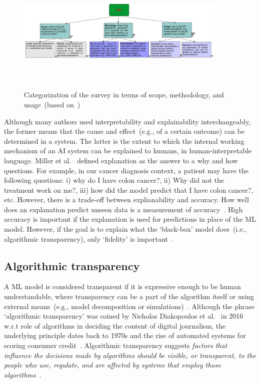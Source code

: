 \begin{figure}[h]
	\centering
	\includegraphics[width=0.9\textwidth,height=60mm]{images/xai_tec.png}	
    \caption{Categorization of the survey in terms of scope, methodology, and usage~(based on~\cite{das2020opportunities})}	
	\label{fig:survey_xai}
\end{figure}

\hspace*{3.5mm} Although many authors used interpretability and explainability interchangeably, the former means that the cause and effect~(e.g., of a certain outcome) can be determined in a system. The latter is the extent to which the internal working mechanism of an AI system can be explained to humans, in human-interpretable language. Miller et al.~\cite{miller2018explanation} defined explanation as the answer to a why and how questions. For example, in our cancer diagnosis context, a patient may have the following questions: i) why do I have colon cancer?, ii) Why did not the treatment work on me?, iii) how did the model predict that I have colon cancer?, etc. However, there is a trade-off between explianability and accuracy. How well does an explanation predict unseen data is a measurement of accuracy~\cite{molnar2019interpretable}. High accuracy is important if the explanation is used for predictions in place of the ML model. However, if the goal is to explain what the `black-box' model does~(i.e., algorithmic transparency), only `fidelity' is important~\cite{molnar2019interpretable}. 

\subsection{Algorithmic transparency}
A ML model is considered transparent if it is expressive enough to be human understandable, where transparency can be a part of the algorithm itself or using external means~(e.g., model decomposition or simulations)~\cite{das2020opportunities}. Although the phrase `algorithmic transparency' was coined by Nicholas Diakopoulos et al.~\cite{diakopoulos2017algorithmic} in 2016 w.r.t role of algorithms in deciding the content of digital journalism, the underlying principle dates back to 1970s and the rise of automated systems for scoring consumer credit~\cite{diakopoulos2015algorithmic}.  Algorithmic transparency suggests \textit{factors that influence the decisions made by algorithms should be visible, or transparent, to the people who use, regulate, and are affected by systems that employ those algorithms}~\cite{diakopoulos2017algorithmic}.  %

